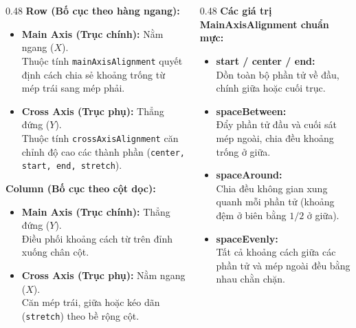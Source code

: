 \documentclass[aspectratio=169, 10pt]{beamer}
\newcommand{\SlideHeader}[2]{%
  \noindent{\textcolor{AccentOrange}{\textbf{\footnotesize #1}}}\\[0.08cm]
  \noindent{\Large \textbf{\textcolor{NavyTitle}{#2}}}\\[0.22cm]
}
\begin{document}
\begin{frame}
  \SlideHeader{CƠ SỞ LÝ THUYẾT}{Trục Chính (Main Axis) \& Trục Phụ (Cross Axis)}

  \begin{columns}[T]
    \begin{column}{0.48\textwidth}
      \textbf{Row (Bố cục theo hàng ngang):}
      \begin{itemize}
        \item \textbf{Main Axis (Trục chính):} Nằm ngang ($X$).\\
        Thuộc tính \texttt{mainAxisAlignment} quyết định cách chia sẻ khoảng trống từ mép trái sang mép phải.
        \item \textbf{Cross Axis (Trục phụ):} Thẳng đứng ($Y$).\\
        Thuộc tính \texttt{crossAxisAlignment} căn chỉnh độ cao các thành phần (\texttt{center, start, end, stretch}).
      \end{itemize}

      \vspace{0.25cm}
      \textbf{Column (Bố cục theo cột dọc):}
      \begin{itemize}
        \item \textbf{Main Axis (Trục chính):} Thẳng đứng ($Y$).\\
        Điều phối khoảng cách từ trên đỉnh xuống chân cột.
        \item \textbf{Cross Axis (Trục phụ):} Nằm ngang ($X$).\\
        Căn mép trái, giữa hoặc kéo dãn (\texttt{stretch}) theo bề rộng cột.
      \end{itemize}
    \end{column}

    \begin{column}{0.48\textwidth}
      \textbf{Các giá trị MainAxisAlignment chuẩn mực:}
      \begin{itemize}
        \item \textbf{start / center / end:}\\
        Dồn toàn bộ phần tử về đầu, chính giữa hoặc cuối trục.
        \item \textbf{spaceBetween:}\\
        Đẩy phần tử đầu và cuối sát mép ngoài, chia đều khoảng trống ở giữa.
        \item \textbf{spaceAround:}\\
        Chia đều không gian xung quanh mỗi phần tử (khoảng đệm ở biên bằng $1/2$ ở giữa).
        \item \textbf{spaceEvenly:}\\
        Tất cả khoảng cách giữa các phần tử và mép ngoài đều bằng nhau chằn chặn.
      \end{itemize}


\end{column}
\end{columns}
\end{frame}
\end{document}
